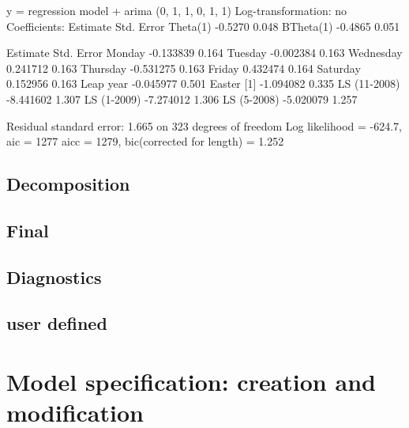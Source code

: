 \documentclass[article]{jss}
\begin{document}
\begin{CodeChunk}


\begin{CodeOutput}
y = regression model + arima (0, 1, 1, 0, 1, 1)
Log-transformation: no
Coefficients:
          Estimate Std. Error
Theta(1)   -0.5270      0.048
BTheta(1)  -0.4865      0.051

              Estimate Std. Error
Monday       -0.133839      0.164
Tuesday      -0.002384      0.163
Wednesday     0.241712      0.163
Thursday     -0.531275      0.163
Friday        0.432474      0.164
Saturday      0.152956      0.163
Leap year    -0.045977      0.501
Easter [1]   -1.094082      0.335
LS (11-2008) -8.441602      1.307
LS (1-2009)  -7.274012      1.306
LS (5-2008)  -5.020079      1.257


Residual standard error: 1.665 on 323 degrees of freedom
Log likelihood = -624.7, aic =  1277 aicc =  1279, bic(corrected for length) = 1.252
\end{CodeOutput}
\end{CodeChunk}

\hypertarget{decomposition}{%
\subsection{Decomposition}\label{decomposition}}

\hypertarget{final}{%
\subsection{Final}\label{final}}

\hypertarget{diagnostics}{%
\subsection{Diagnostics}\label{diagnostics}}

\hypertarget{user-defined}{%
\subsection{user defined}\label{user-defined}}

\hypertarget{model-specification-creation-and-modification}{%
\section{Model specification: creation and
modification}\label{model-specification-creation-and-modification}}
\end{document}
